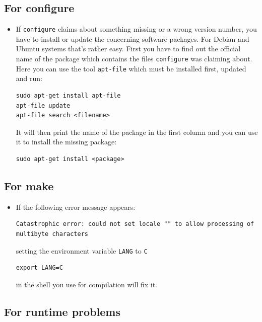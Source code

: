 \documentclass[12pt, oneside, a4paper, headsepline, plainheadsepline]{scrbook}
\begin{document}
\subsection{For configure}
\begin{itemize}

\item If \verb+configure+ claims about something missing or a wrong version number, you have to
install or update the concerning software packages. 
For Debian and Ubuntu systems that's rather easy. 
First you have to find out the official name of the package which contains the files \verb+configure+ 
was claiming about. Here you can use the tool \verb+apt-file+ which must be installed first, updated and run: 
\begin{lstlisting}
sudo apt-get install apt-file
apt-file update
apt-file search <filename>
\end{lstlisting}
It will then print the name of the package in the first column and you can use it to install the missing package:
\begin{lstlisting}
sudo apt-get install <package>
\end{lstlisting}
\end{itemize}

\subsection{For make}
\begin{itemize}
 \item If the following error message appears:
\begin{lstlisting}
Catastrophic error: could not set locale "" to allow processing of 
multibyte characters
\end{lstlisting} 
setting the environment variable \verb+LANG+ to \verb+C+
\begin{lstlisting}
export LANG=C
\end{lstlisting} 
in the shell you use for compilation will fix it.
\end{itemize}

\subsection{For runtime problems}
\end{document}
